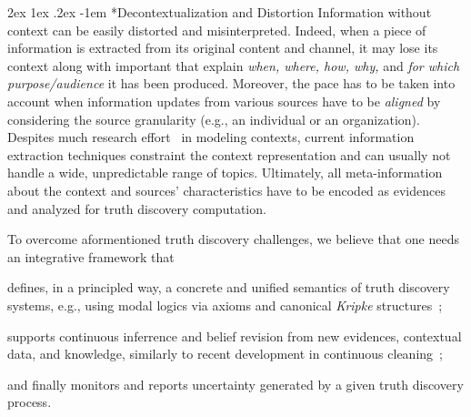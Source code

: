 \documentclass[prodmode,acmtecs]{acmsmall} %
\makeatletter
\renewcommand\paragraph{\@startsection{paragraph}{5}{\z@}%
                                       {2ex \@plus1ex \@minus .2ex}%
                                       {-1em}%
                                      {\sffamily\normalsize\bfseries}}
\makeatother
\begin{document}
\paragraph*{Decontextualization and Distortion}  
Information without context can be easily distorted and misinterpreted.
Indeed, when a piece of information is extracted from its original 
content and channel, it may lose its context along with important 
 that explain \emph{when, where, how, why,} and
\emph{for which purpose/audience} it has been produced.
Moreover, the pace has to be taken into account when information updates from 
various sources have to be \emph{aligned} by considering the source granularity 
(e.g., an individual or an organization). 
Despites much research effort~\cite{eps270829} in modeling contexts, current information
extraction techniques constraint the 
context representation and can usually not handle a wide, unpredictable range of topics. Ultimately,
all meta-information about the context and sources' 
characteristics have to be encoded as evidences and analyzed for truth discovery computation.


To overcome aformentioned truth discovery challenges, we believe that one needs an integrative framework that
\begin{inparaenum}[(i)]
\item defines, in a principled way, a concrete and unified semantics of truth discovery systems, e.g., using
modal logics via axioms and canonical 
\emph{Kripke} structures~\cite{GorankoOtto06};
\item supports continuous inferrence and belief revision from new evidences, contextual data, and knowledge, 
similarly to recent development in continuous cleaning~\cite{VCSM14};
\item and finally monitors and reports uncertainty generated by a given truth discovery process.
\end{inparaenum}




\end{document}
